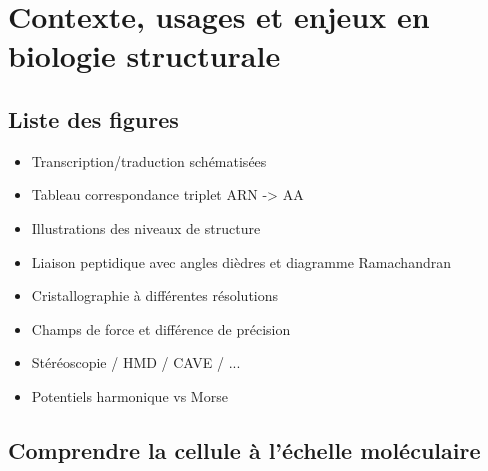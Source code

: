 \chapter[Contexte en biologie structurale]{Contexte, usages et enjeux en biologie structurale}
\minitoc
\cleardoublepage


\section{Liste des figures}

\begin{itemize}
	\item Transcription/traduction schématisées
	\item Tableau correspondance triplet ARN -> AA
	\item Illustrations des niveaux de structure
	\item Liaison peptidique avec angles dièdres et diagramme Ramachandran
	\item Cristallographie à différentes résolutions
	\item Champs de force et différence de précision
	\item Stéréoscopie / HMD / CAVE / ...
	\item Potentiels harmonique vs Morse
\end{itemize}

\section{Comprendre la cellule à l'échelle moléculaire}

